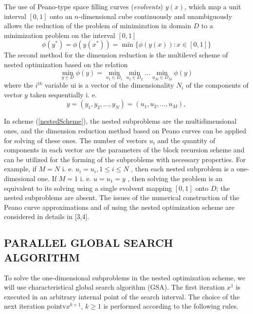 \documentclass{aip-cp}
\begin{document}
The use of Peano-type space filling curves (\textit{evolvents}) $y(x)$, which map a unit interval $[0,1]$ onto an $n$-dimensional cube continuously and unambiguously allows the reduction of the problem of minimization in domain $D$ to a minimization problem on the interval $[0,1]$
\begin{equation}
\label{evolvent}
\phi(y^*)=\phi(y(x^*))=\min\{\phi(y(x)):x\in [0,1]\}
\end{equation}
The second method for the dimension reduction is the multilevel scheme of nested optimization based on the relation
\begin{equation}
\label{nestedScheme}
\min_{y\in D}\phi(y) =\min_{u_1\in D_1}\min_{u_2\in D_2}\dots\min_{u_M\in D_M }\phi(y)
\end{equation}
where the $i^{th}$ variable ui is a vector of the dimensionality $N_i$ of the components of vector $y$ taken sequentially i. e.
\begin{equation}
y=(y_1, y_2, \dots ,y_N)=(u_1,u_2,\dots,u_M),
\end{equation}

In scheme (\ref{nestedScheme}), the nested subproblems are the multidimensional ones, and the dimension reduction method based on Peano curves can be applied for solving of these ones. The number of vectors $u_i$ and the quantity of components in each vector are the parameters of the block recursion scheme and can be utilized for the forming of the subproblems with necessary properties. For example, if $M=N$ i. e. $u_i=u_i,1\leqslant i\leqslant N$ , then each nested subproblem is a one-dimesional one. If $M=1$ i. e. $u=u_1=y$ , then solving the problem is an equivalent to its solving using a single evolvent mapping $[0,1]$ onto $D$; the nested subproblems are absent.
The issues of the numerical construction of the Peano curve approximations and of using the nested optimization scheme are considered in details in [3,4].

\subsection{PARALLEL GLOBAL SEARCH ALGORITHM}
To solve the one-dimensional subproblems in the nested optimization scheme, we will use characteristical global search algorithm (GSA).
The first iteration $x^1$ is executed in an arbitrary internal point of the search interval. The choice of the next iteration pointv$x^{k+1}$, $k\geqslant 1$ is performed according to the following rules.
\end{document}

